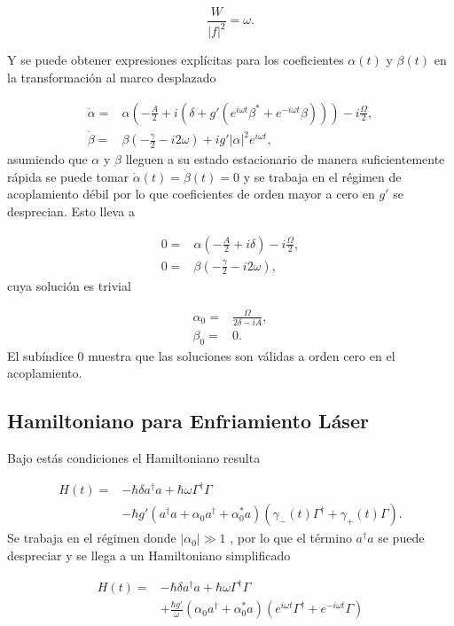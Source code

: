\documentclass[10pt,a4paper]{report}
\begin{document}
\begin{equation}
\frac{W}{|f|^2} = \omega.
\end{equation} 

Y se puede obtener expresiones explícitas para los coeficientes $\alpha(t)$ y $\beta(t)$ en la transformación al marco desplazado

\begin{align}
\dot{\alpha} =& \alpha(-\frac{A}{2}+i(\delta+g'(e^{i\omega t} \beta^* + e^{-i\omega t} \beta)))-i\frac{\Omega}{2},\\
\dot{\beta} =& \beta(-\frac{\gamma}{2}-i 2\omega)+ig'|\alpha|^2e^{i\omega t},
\end{align}
 asumiendo que $\alpha$ y $\beta$ lleguen a su estado estacionario de manera suficientemente rápida se puede tomar $\dot{\alpha}(t)=\dot{\beta}(t)=0$ y se trabaja
en el régimen de acoplamiento débil por lo que coeficientes de orden
mayor a cero en $g'$ se desprecian. Esto lleva a

\begin{align}
0 =& \alpha(-\frac{A}{2}+i\delta)-i\frac{\Omega}{2},\\
0 =& \beta(-\frac{\gamma}{2}-i 2\omega),
\end{align} cuya solución es trivial 

\begin{align}
\alpha_0 =& \frac{\Omega}{2\delta-iA},\\
\beta_0 =& 0.
\end{align} El subíndice 0 muestra que las soluciones son válidas a orden cero en el acoplamiento.

\subsection{Hamiltoniano para Enfriamiento Láser}

Bajo estás condiciones  el Hamiltoniano resulta

\begin{align}
H(t) =& -\hbar \delta a^{\dagger}a +\hbar\omega\Gamma^{\dagger}\Gamma \\
&-\hbar g'(a^{\dagger}a +\alpha_0 a^{\dagger}+\alpha^*_0 a)(\gamma_-(t)\Gamma^{\dagger}+\gamma_+(t)\Gamma)\nonumber.
\end{align}
Se trabaja en el régimen donde $|\alpha_0| \gg 1$
\cite{BarberisLC}, por lo que el término $a^\dagger a$ se puede
despreciar y se llega a un Hamiltoniano simplificado

\begin{align} \label{LCHamiltonian}
H(t) =& -\hbar \delta a^{\dagger}a +\hbar\omega\Gamma^{\dagger}\Gamma \\
&+\frac{\hbar g'}{\omega}(\alpha_0 a^{\dagger}+\alpha^*_0 a)(e^{i\omega t} \nonumber\Gamma^{\dagger}+e^{-i\omega t}\Gamma)
\end{align}
\end{document}
